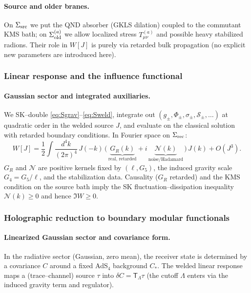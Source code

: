 \documentclass[10pt]{article}
\theoremstyle{definition}
\theoremstyle{plain}
\begin{document}
\paragraph{Source and older branes.}\label{par:uom-main-079}
On $\Sigma_{\rm src}$ we put the QND absorber (GKLS dilation) coupled to the commutant KMS bath; on $\Sigma_{\rm old}^{(a)}$ we allow localized stress $T^{(a)}_{\mu\nu}$ and possible heavy stabilized radions. Their role in $W[J]$ is purely via retarded bulk propagation (no explicit new parameters are introduced here).

\subsubsection*{Linear response and the influence functional}
\label{subsubsec:linresp-W}

\paragraph{Gaussian sector and integrated auxiliaries.}\label{par:uom-main-080}
We SK–double \eqref{eq:Sgrav}–\eqref{eq:Sweld}, integrate out $(g_{\pm},\Phi_{\pm},\sigma_{\pm},\mathcal S_{\pm},\ldots)$ at quadratic order in the welded source $J$, and evaluate on the classical solution with retarded boundary conditions. In Fourier space on $\Sigma_{\rm rec}$:
\begin{equation}
W[J]
=\frac12\!\int\!\frac{d^4k}{(2\pi)^4}\,
J(-k)\,\big(\,\underbrace{G_R(k)}_{\text{real, retarded}} + i\,\underbrace{\mathcal N(k)}_{\text{noise/Hadamard}}\,\big)\,J(k)
+O(J^3).
\label{eq:W-quadratic}
\end{equation}
$G_R$ and $\mathcal N$ are positive kernels fixed by $(\ell,G_5)$, the induced gravity scale $G_4=G_5/\ell$, and the stabilization data. 
Causality ($G_R$ retarded) and the KMS condition on the source bath imply the SK fluctuation–dissipation inequality $\mathcal N(k)\ge 0$ and hence $\Im W\ge 0$.


\subsubsection*{Holographic reduction to boundary modular functionals}\label{subsubsec:uom-main-011}

\paragraph{Linearized Gaussian sector and covariance form.}\label{par:uom-main-081}
In the radiative sector (Gaussian, zero mean), the receiver state is determined by a covariance $C$ around a fixed AdS$_4$ background $C_\ast$. The welded linear response maps a (trace–channel) source $\tau$ into $\delta C=\mathsf T_\Lambda \tau$ (the cutoff $\Lambda$ enters via the induced gravity term and regulator).
\end{document}
